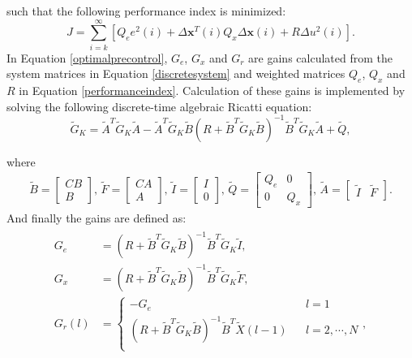 such that the following performance index is minimized:
\begin{equation}
\label{performanceindex}
J=\sum_{i=k}^{\infty}\left[Q_ee^2(i)+\Delta\bm{x}^T(i)Q_x\Delta\bm{x}(i)+R\Delta u^2(i)\right].
\end{equation}
In Equation {\ref{optimalprecontrol}}, $ G_e $, $ G_x $ and $ G_r $ are gains calculated from the system matrices in Equation {\ref{discretesystem}} and weighted matrices $ Q_e $, $ Q_x $ and $ R $ in Equation {\ref{performanceindex}}. Calculation of these gains is implemented by solving the following discrete-time algebraic Ricatti equation:
\begin{equation}
\tilde{G}_K=\tilde{A}^T\tilde{G}_K\tilde{A}-\tilde{A}^T\tilde{G}_K\tilde{B}\left(R+\tilde{B}^T\tilde{G}_K\tilde{B}\right)^{-1}\tilde{B}^T\tilde{G}_K\tilde{A}+\tilde{Q},
\end{equation}

where 
\begin{align*}
\tilde{B} = \begin{bmatrix}
CB\\B
\end{bmatrix},\,\tilde{F} = \begin{bmatrix}
CA\\A
\end{bmatrix},\,\tilde{I} = \begin{bmatrix}
I\\0
\end{bmatrix},\,\tilde{Q} = \begin{bmatrix}
Q_e&0\\0&Q_x
\end{bmatrix},\,\tilde{A} = \begin{bmatrix}
\tilde{I}&\tilde{F}
\end{bmatrix}.
\end{align*}
And finally the gains are defined as:
\begin{align}
\begin{split}
G_e &= \left(R+\tilde{B}^T\tilde{G}_K\tilde{B}\right)^{-1}\tilde{B}^T\tilde{G}_K\tilde{I},\\
G_x &= \left(R+\tilde{B}^T\tilde{G}_K\tilde{B}\right)^{-1}\tilde{B}^T\tilde{G}_K\tilde{F},\\
G_r(l) &= \left\{\begin{array}{lcl}
-G_e &      & l=1\\
\left(R+\tilde{B}^T\tilde{G}_K\tilde{B}\right)^{-1}\tilde{B}^T\tilde{X}(l-1)     &      & l=2, \cdots, N\\
\end{array}\right. ,
\end{split}
\end{align}


